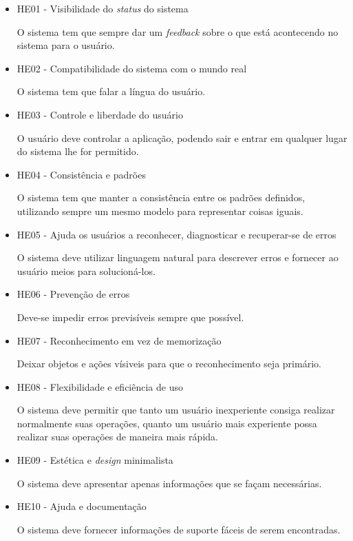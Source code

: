     \begin{itemize}
     \item HE01 - Visibilidade do \textit{status} do sistema
  
	\subitem O sistema tem que sempre dar um \textit{feedback} sobre o que está acontecendo no sistema para o usuário.
     
     \item HE02 - Compatibilidade do sistema com o mundo real
  
	\subitem O sistema tem que falar a língua do usuário.
	
     \item HE03 - Controle e liberdade do usuário
     
	\subitem O usuário deve controlar a aplicação, podendo sair e entrar em qualquer lugar do sistema lhe for permitido.
     
     \item HE04 - Consistência e padrões
      
	\subitem O sistema tem que manter a consistência entre os padrões definidos, utilizando sempre um mesmo modelo para representar
	coisas iguais.
	
     \item HE05 - Ajuda os usuários a reconhecer, diagnosticar e recuperar-se de erros
	
	\subitem O sistema deve utilizar linguagem natural para descrever erros e fornecer ao usuário meios para solucioná-los.
	
     \item HE06 - Prevenção de erros
	
	\subitem Deve-se impedir erros previsíveis sempre que possível.
	
     \item HE07 - Reconhecimento em vez de memorização
	
	\subitem Deixar objetos e ações vísiveis para que o reconhecimento seja primário.
	
     \item HE08 - Flexibilidade e eficiência de uso
	
	\subitem O sistema deve permitir que tanto um usuário inexperiente consiga realizar normalmente suas operações,
	quanto um usuário mais experiente possa realizar suas operações de maneira mais rápida.
	
     \item HE09 - Estética e \textit{design} minimalista
	
	\subitem O sistema deve apresentar apenas informações que se façam necessárias.
	
     \item HE10 - Ajuda e documentação
     
	\subitem O sistema deve fornecer informações de suporte fáceis de serem encontradas.
      
    \end{itemize}
    
